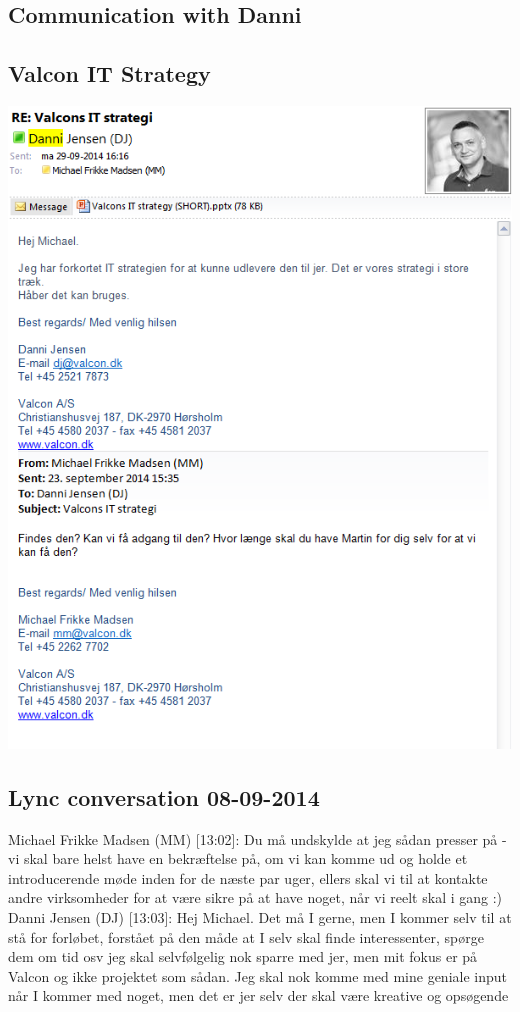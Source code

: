 \begin{linenumbers*}

\section{Communication with Danni}

\subsection{Valcon IT Strategy}
\includegraphics[width=1.36\textwidth]{appendix/danni_communication_1}

\subsection{Lync conversation 08-09-2014}
Michael Frikke Madsen (MM) [13:02]: 
Du må undskylde at jeg sådan presser på - vi skal bare helst have en bekræftelse på, om vi kan komme ud og holde et introducerende møde inden for de næste par uger, ellers skal vi til at kontakte andre virksomheder for at være sikre på at have noget, når vi reelt skal i gang :) \newline
Danni Jensen (DJ) [13:03]: 
Hej Michael. Det må I gerne, men I kommer selv til at stå for forløbet, forstået på den måde at I selv skal finde interessenter, spørge dem om tid osv
jeg skal selvfølgelig nok sparre med jer, men mit fokus er på Valcon og ikke projektet som sådan. Jeg skal nok komme med mine geniale input når I kommer med noget, men det er jer selv der skal være kreative og opsøgende


\end{linenumbers*}
